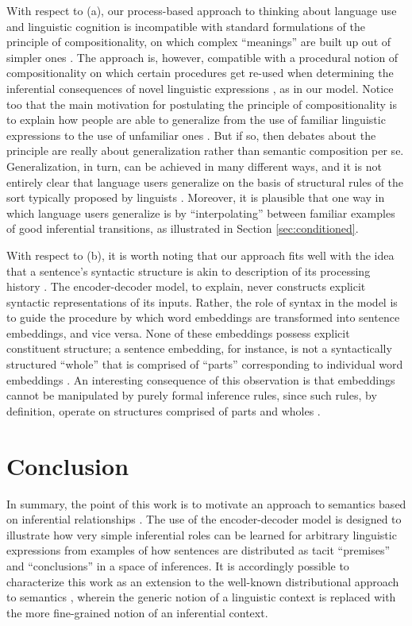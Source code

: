 \documentclass[utf8]{frontiersSCNS} %
\begin{document}
With respect to (a), our process-based approach to thinking about language use and linguistic cognition is incompatible with standard formulations of the principle of compositionality, on which complex ``meanings'' are built up out of simpler ones \citep{Szabo:2013,FodorLepore:1991}. The approach is, however, compatible with a procedural notion of compositionality on which certain procedures get re-used when determining the inferential consequences of novel linguistic expressions \citep{Blouw:2017}, as in our model. Notice too that the main motivation for postulating the principle of compositionality is to explain how people are able to generalize from the use of familiar linguistic expressions to the use of unfamiliar ones \citep{Szabo:2012,FodorPylyshyn:1988,FodorLepore:2002}. But if so, then debates about the principle are really about generalization rather than semantic composition per se. Generalization, in turn, can be achieved in many different ways, and it is not entirely clear that language users generalize on the basis of structural rules of the sort typically proposed by linguists \citep{Tomasello:2003}. Moreover, it is plausible that one way in which language users generalize is by ``interpolating'' between familiar examples of good inferential transitions, as illustrated in Section \ref{sec:conditioned}.

With respect to (b), it is worth noting that our approach fits well with the idea that a sentence's syntactic structure is akin to description of its processing history \citep{Christiansen:2015,Lupyan:2015}. The encoder-decoder model, to explain, never constructs explicit syntactic representations of its inputs. Rather, the role of syntax in the model is to guide the procedure by which word embeddings are transformed into sentence embeddings, and vice versa. None of these embeddings possess explicit constituent structure; a sentence embedding, for instance, is not a syntactically structured ``whole'' that is comprised of ``parts'' corresponding to individual word embeddings \citep{Eliasmith:2013}. An interesting consequence of this observation is that embeddings cannot be manipulated by purely formal inference rules, since such rules, by definition, operate on structures comprised of parts and wholes \citep{FodorPylyshyn:1988,Marcus:1998}.

\section{Conclusion}

In summary, the point of this work is to motivate an approach to semantics based on inferential relationships \citep{Brandom:1994}. The use of the encoder-decoder model is designed to illustrate how very simple inferential roles can be learned for arbitrary linguistic expressions from examples of how sentences are distributed as tacit ``premises'' and ``conclusions'' in a space of inferences. It is accordingly possible to characterize this work as an extension to the well-known distributional approach to semantics \citep{TurneyPantel:2010}, wherein the generic notion of a linguistic context is replaced with the more fine-grained notion of an inferential context. 
\end{document}

